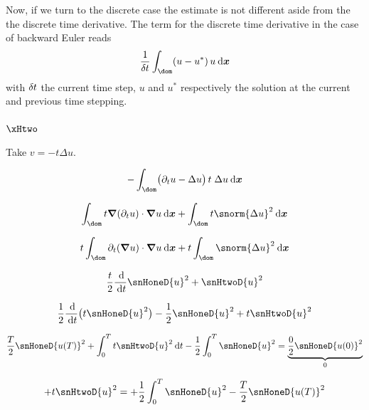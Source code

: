 \medskip
Now, if we turn to the discrete case the estimate is not different aside from the the discrete time derivative.
The term for the discrete time derivative in the case of backward Euler reads
\begin{equation*}
\dfrac{1}{\kt}\int_\dom (u - u^\ast)\, u \dxx
\end{equation*}
with $\delta \hspace{-0.05ex} t$ the current time step, $u$ and $u^\ast$ respectively the solution at the current and previous time stepping.

\subsubsection{$\xHtwo$}

Take $v = - t \Delta u$.

\begin{equation*}
- \int_\dom \bigl(\partial_t u - \Delta u\bigr)\,t\;\Delta u \dxx
\end{equation*}


\begin{equation*}
\int_\dom t \Grad(\partial_t u)\cdot\Grad u  \dxx + \int_\dom t \snorm{\Delta u}^2 \dxx
\end{equation*}

\begin{equation*}
t \int_\dom \partial_t(\Grad u)\cdot\Grad u \dxx + t \int_\dom \snorm{\Delta u}^2 \dxx
\end{equation*}

\begin{equation*}
\dfrac{t}{2}\dfrac{\md}{\dt}\snHoneD{u}^2 + \snHtwoD{u}^2
\end{equation*}

\begin{equation*}
\dfrac{1}{2}\dfrac{\md}{\dt}\bigl(t \snHoneD{u}^2\bigr) - \dfrac{1}{2} \snHoneD{u}^2 + t\snHtwoD{u}^2
\end{equation*}

\begin{equation*}
\dfrac{T}{2}\snHoneD{u(T)}^2 + \int_0^T t\snHtwoD{u}^2 \dt - \dfrac{1}{2}\int_0^T \snHoneD{u}^2 = \underbrace{\dfrac{0}{2}\snHoneD{u(0)}^2}_{0}
\end{equation*}

\begin{equation*}
+ t\snHtwoD{u}^2 = + \dfrac{1}{2}\int_0^T \snHoneD{u}^2 - \dfrac{T}{2}\snHoneD{u(T)}^2
\end{equation*}























